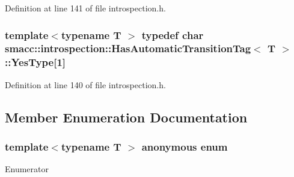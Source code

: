 Definition at line 141 of file introspection.\+h.

\subsubsection[{\texorpdfstring{Yes\+Type}{YesType}}]{\setlength{\rightskip}{0pt plus 5cm}template$<$typename T $>$ typedef char {\bf smacc\+::introspection\+::\+Has\+Automatic\+Transition\+Tag}$<$ T $>$\+::Yes\+Type\mbox{[}1\mbox{]}\hspace{0.3cm}{\ttfamily [private]}}\hypertarget{classsmacc_1_1introspection_1_1HasAutomaticTransitionTag_a750a08a185de0fa20331ba7cfc531dde}{}\label{classsmacc_1_1introspection_1_1HasAutomaticTransitionTag_a750a08a185de0fa20331ba7cfc531dde}


Definition at line 140 of file introspection.\+h.



\subsection{Member Enumeration Documentation}
\subsubsection[{\texorpdfstring{anonymous enum}{anonymous enum}}]{\setlength{\rightskip}{0pt plus 5cm}template$<$typename T $>$ anonymous enum}\hypertarget{classsmacc_1_1introspection_1_1HasAutomaticTransitionTag_aa4d176f174bc660b4705a0ff3874d4ac}{}\label{classsmacc_1_1introspection_1_1HasAutomaticTransitionTag_aa4d176f174bc660b4705a0ff3874d4ac}
\begin{Desc}
\item[Enumerator]\par
\begin{description}
\item[{\em 
value\hypertarget{classsmacc_1_1introspection_1_1HasAutomaticTransitionTag_aa4d176f174bc660b4705a0ff3874d4aca4e813bb149aec14797ea59791542e845}{}\label{classsmacc_1_1introspection_1_1HasAutomaticTransitionTag_aa4d176f174bc660b4705a0ff3874d4aca4e813bb149aec14797ea59791542e845}
}]\end{description}
\end{Desc}


